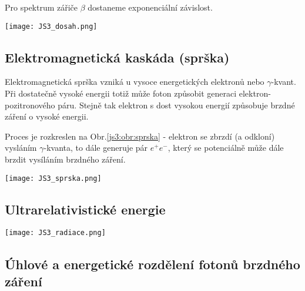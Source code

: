 \documentclass[../../main.tex]{subfiles}
\begin{document}
Pro spektrum zářiče $\beta$ dostaneme exponenciální závislost.

\begin{center}
	\texttt{[image: JS3\_dosah.png]}
\end{center}

\subsection{Elektromagnetická kaskáda (sprška)}

Elektromagnetická sprška vzniká u vysoce energetických elektronů nebo $\gamma$-kvant. Při dostatečně vysoké energii totiž může foton způsobit generaci elektron-pozitronového páru. Stejně tak elektron s dost vysokou energií způsobuje brzdné záření o vysoké energii.

Proces je rozkreslen na Obr.\ref{js3:obr:sprska} - elektron se zbrzdí (a odkloní) vysláním $\gamma$-kvanta, to dále generuje pár $e^+ e^-$, který se potenciálně může dále brzdit vysíláním brzdného záření.

\begin{center}
	\texttt{[image: JS3\_sprska.png]}
\end{center}

\subsection{Ultrarelativistické energie}

\begin{center}
	\texttt{[image: JS3\_radiace.png]}
\end{center}

\subsection{Úhlové a energetické rozdělení fotonů brzdného záření}
\end{document}
